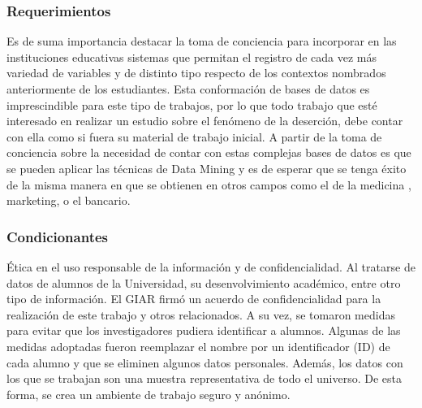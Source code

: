 
\subsubsection{Requerimientos}
Es de suma importancia destacar la toma de conciencia para incorporar en las instituciones educativas sistemas que permitan el registro de cada vez más variedad de variables y de distinto tipo respecto de los contextos nombrados anteriormente de los estudiantes.
Esta conformación de bases de datos es imprescindible para este tipo de trabajos, por lo que todo trabajo que esté interesado en realizar un estudio sobre el fenómeno de la deserción, debe contar con ella como si fuera su material de trabajo inicial.
A partir de la toma de conciencia sobre la necesidad de contar con estas complejas bases de datos es que se pueden aplicar las técnicas de Data Mining y es de esperar que se tenga éxito de la misma manera en que se obtienen en otros campos como el de la medicina \cite{Adnan2013DataReview}, marketing, o el bancario\cite{Kirkos2007DataStatements}.


\subsubsection{Condicionantes}\label{seccion:condicionantes}
Ética en el uso responsable de la información y de confidencialidad.
Al tratarse de datos de alumnos de la Universidad, su desenvolvimiento académico, entre otro tipo de información. El GIAR  firmó un acuerdo de confidencialidad para la realización de este trabajo y otros relacionados. A su vez, se tomaron medidas para evitar que los investigadores pudiera identificar a alumnos. Algunas de las medidas adoptadas fueron reemplazar el nombre por un identificador (ID) de cada alumno y que se
eliminen algunos datos personales.
Además, los datos con los que se trabajan son una muestra representativa de todo el universo.
De esta forma, se crea un ambiente de trabajo seguro y anónimo.
